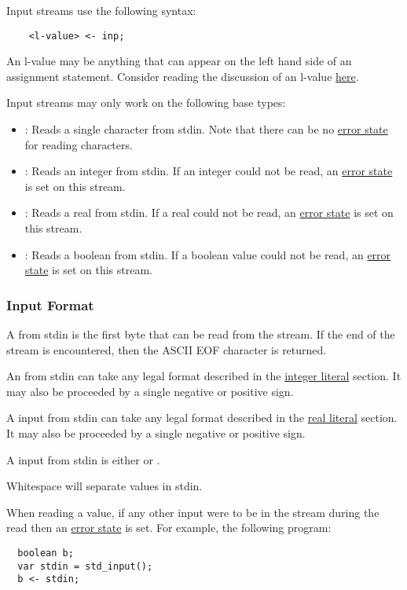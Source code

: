 \documentclass[../gazprea.tex]{subfiles}
\begin{document}
Input streams use the following syntax:
\begin{lstlisting}
	<l-value> <- inp;
\end{lstlisting}

An l-value may be anything that can appear on the left hand side of an assignment statement.
Consider reading the discussion of an l-value
\href{https://en.wikipedia.org/wiki/Value_(computer_science)\#Assignment:_l-values_and_r-values}
{here}.

Input streams may only work on the following base types:
\begin{itemize}
	\item
    : Reads a single character from stdin. Note that there can be no
    \hyperref[sssec:stream_error]{error state} for reading characters.
	\item {}:
    Reads an integer from stdin. If an integer could not be read, an \hyperref[sssec:stream_error]
    {error state} is set on this stream.
	\item {}:
    Reads a real from stdin. If a real could not be read, an \hyperref[sssec:stream_error]{error
    state} is set on this stream.
	\item {}:
    Reads a boolean from stdin. If a boolean value could not be read, an
    \hyperref[sssec:stream_error]{error state} is set on this stream.
\end{itemize}

\subsubsection{Input Format}
\label{sssec:input_format}
A  from stdin is the first byte that can be read from the stream. If the end of the
stream is encountered, then the ASCII EOF character is returned.

An  from stdin can take any legal format described in the \hyperref[sssec:int_lit]
{integer literal} section. It may also be proceeded by a single negative or positive sign.

A  input from stdin can take any legal format described in the \hyperref[sssec:real_lit]
{real literal} section. It may also be proceeded by a single negative or positive sign.

A  input from stdin is either  or .

Whitespace will separate values in stdin.

When reading a value, if any other input were to be in the stream during the read then an
\hyperref[sssec:stream_error]{error state} is set. For example, the following program:
\begin{lstlisting}
  boolean b;
  var stdin = std_input();
  b <- stdin;
\end{lstlisting}
\end{document}
